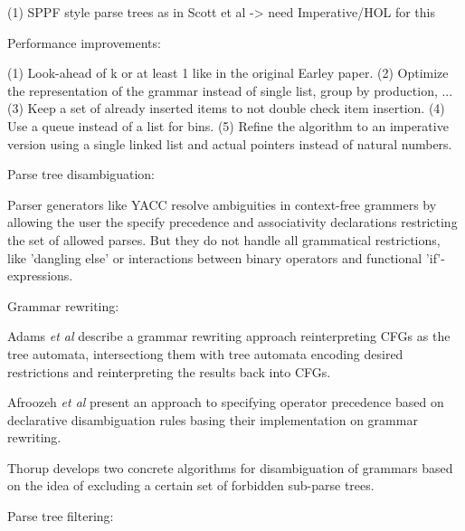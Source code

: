 \begin{isabellebody}
\begin{isamarkuptext}
(1) SPPF style parse trees as in Scott et al -> need Imperative/HOL for this

Performance improvements:

(1) Look-ahead of k or at least 1 like in the original Earley paper.
(2) Optimize the representation of the grammar instead of single list, group by production, ...
(3) Keep a set of already inserted items to not double check item insertion.
(4) Use a queue instead of a list for bins.
(5) Refine the algorithm to an imperative version using a single linked list and actual pointers instead
    of natural numbers.%
\end{isamarkuptext}\isamarkuptrue%
%
\begin{isamarkuptext}%
Parse tree disambiguation:

Parser generators like YACC resolve ambiguities in context-free grammers by allowing the user
the specify precedence and associativity declarations restricting the set of allowed parses. But they
do not handle all grammatical restrictions, like 'dangling else' or interactions between binary operators
and functional 'if'-expressions.

Grammar rewriting:

Adams \textit{et al} \cite{Adams:2017} describe a grammar rewriting approach reinterpreting CFGs as
the tree automata, intersectiong them with tree automata encoding desired restrictions and reinterpreting
the results back into CFGs.

Afroozeh \textit{et al} \cite{Afroozeh:2013} present an approach to specifying operator precedence
based on declarative disambiguation rules basing their implementation on grammar rewriting.

Thorup \cite{Thorup:1996} develops two concrete algorithms for disambiguation of grammars based on the idea of 
excluding a certain set of forbidden sub-parse trees.

Parse tree filtering:


\end{isamarkuptext}
\end{isabellebody}
